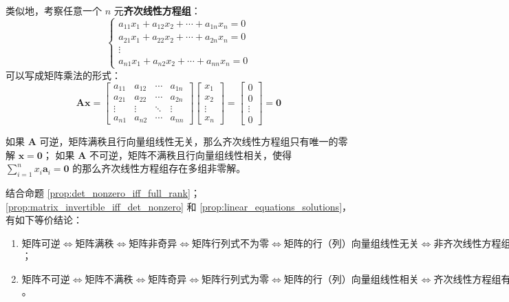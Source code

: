 类似地，考察任意一个 $n$ 元\textbf{齐次线性方程组}：
\[
    \begin{cases}
        a_{11}x_1 + a_{12}x_2 + \cdots + a_{1n}x_n = 0 \\
        a_{21}x_1 + a_{22}x_2 + \cdots + a_{2n}x_n = 0 \\
        \vdots \\
        a_{n1}x_1 + a_{n2}x_2 + \cdots + a_{nn}x_n = 0
    \end{cases}
\]
可以写成矩阵乘法的形式：
\[
    \mathbf{A}\mathbf{x} = \begin{bmatrix}
        a_{11} & a_{12} & \cdots & a_{1n} \\
        a_{21} & a_{22} & \cdots & a_{2n} \\
        \vdots & \vdots & \ddots & \vdots \\
        a_{n1} & a_{n2} & \cdots & a_{nn}
    \end{bmatrix}\begin{bmatrix}
        x_1 \\
        x_2 \\
        \vdots\\
        x_n
    \end{bmatrix}=
    \begin{bmatrix}
        0 \\
        0 \\
        \vdots\\
        0
    \end{bmatrix} = \mathbf{0}
\]

如果 $\mathbf{A}$ 可逆，矩阵满秩且行向量组线性无关，那么齐次线性方程组只有唯一的零解 $\mathbf{x} = \mathbf{0}$；
如果 $\mathbf{A}$ 不可逆，矩阵不满秩且行向量组线性相关，使得 $\sum^n_{i=1}x_i\mathbf{a}_i = \mathbf{0}$ 的那么齐次线性方程组存在多组非零解。

\begin{note}
    结合命题 \ref{prop:det_nonzero_iff_full_rank}；\ref{prop:matrix_invertible_iff_det_nonzero} 和 \ref{prop:linear_equations_solutions}，有如下等价结论：
    \begin{enumerate}
        \item $\text{矩阵可逆}\iff \text{矩阵满秩}\iff\text{矩阵非奇异}\iff\text{矩阵行列式不为零}\iff\text{矩阵的行（列）向量组线性无关}\iff \text{非齐次线性方程组有唯一非零解}$ ；
        \item $\text{矩阵不可逆} \iff \text{矩阵不满秩} \iff \text{矩阵奇异} \iff \text{矩阵行列式为零} \iff \text{矩阵的行（列）向量组线性相关}\iff \text{齐次线性方程组有存在非零解}$。
    \end{enumerate}
\end{note}
\vspace{1em}

